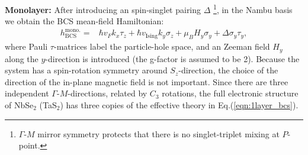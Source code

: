 \vspace{1em}
\textbf{Monolayer:} After introducing an spin-singlet pairing $\Delta$ \footnote{$\Gamma$-$M$ mirror symmetry protects that there is no singlet-triplet mixing at $P$-point.}, in the Nambu basis we obtain the BCS mean-field Hamiltonian:
\begin{align}\label{eqn:1layer_bcs}
	h^{\text{mono.}}_{\text{BCS}}= & \hbar v_F k_x \tau_z+ \hbar v_{\text{Ising}} k_y\sigma_z+\mu_B H_y \sigma_y+\Delta \sigma_y\tau_y,
\end{align}
where Pauli $\tau$-matrices label the particle-hole space, and an Zeeman field $H_y$ along the $y$-direction is introduced (the g-factor is assumed to be 2). Because the system has a spin-rotation symmetry around $S_z$-direction, the choice of the direction of the in-plane magnetic field is not important. Since there are three independent $\Gamma$-$M$-directions, related by $C_3$ rotations, the full electronic structure of NbSe$_2$ (TaS$_2$) has three copies of the effective theory in Eq.(\ref{eqn:1layer_bcs}).
